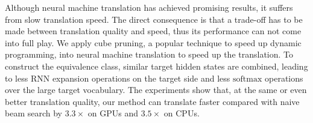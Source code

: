 Although neural machine translation has achieved promising results, it suffers from slow translation speed. The direct consequence is that a trade-off has to be made between translation quality and speed, thus its performance can not come into full play. We apply cube pruning, a popular technique to speed up dynamic programming, into neural machine translation to speed up the translation. To construct the equivalence class, similar target hidden states are combined, leading to less RNN expansion operations on the target side and less $\mathrm{softmax}$ operations over the large target vocabulary. The experiments show that, at the same or even better translation quality, our method can translate faster compared with naive beam search by $3.3\times$ on GPUs and $3.5\times$ on CPUs.
